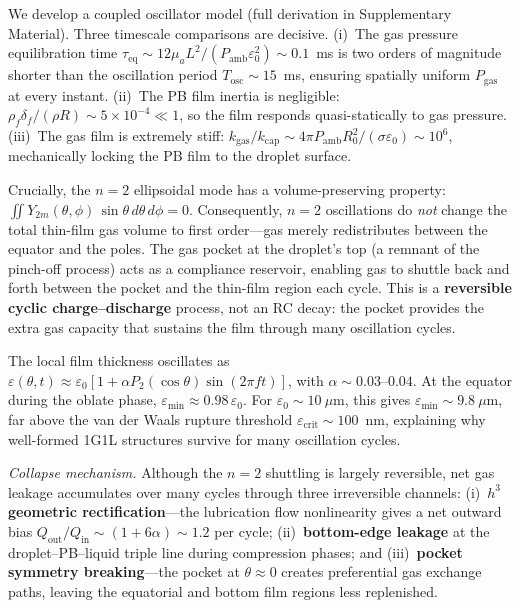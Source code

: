 \documentclass[%
 preprint,
 superscriptaddress,
 amsmath,amssymb,
 aps, prl,
]{revtex4-2}
\begin{document}
We develop a coupled oscillator model (full derivation in Supplementary Material). Three timescale comparisons are decisive. (i)~The gas pressure equilibration time $\tau_{\text{eq}} \sim 12\mu_a L^2/(P_{\text{amb}}\varepsilon_0^2) \sim 0.1$~ms is two orders of magnitude shorter than the oscillation period $T_{\text{osc}} \sim 15$~ms, ensuring spatially uniform $P_{\text{gas}}$ at every instant. (ii)~The PB film inertia is negligible: $\rho_f\delta_f/(\rho R) \sim 5\times10^{-4} \ll 1$, so the film responds quasi-statically to gas pressure. (iii)~The gas film is extremely stiff: $k_{\text{gas}}/k_{\text{cap}} \sim 4\pi P_{\text{amb}}R_0^2/(\sigma\varepsilon_0) \sim 10^6$, mechanically locking the PB film to the droplet surface.\par

Crucially, the $n=2$ ellipsoidal mode has a volume-preserving property: $\iint Y_{2m}(\theta,\phi)\,\sin\theta\,d\theta\,d\phi = 0$. Consequently, $n=2$ oscillations do \textit{not} change the total thin-film gas volume to first order---gas merely redistributes between the equator and the poles. The gas pocket at the droplet's top (a remnant of the pinch-off process) acts as a compliance reservoir, enabling gas to shuttle back and forth between the pocket and the thin-film region each cycle. This is a \textbf{reversible cyclic charge--discharge} process, not an RC decay: the pocket provides the extra gas capacity that sustains the film through many oscillation cycles.\par

The local film thickness oscillates as $\varepsilon(\theta,t) \approx \varepsilon_0[1 + \alpha P_2(\cos\theta)\sin(2\pi f t)]$, with $\alpha \sim 0.03$--$0.04$. At the equator during the oblate phase, $\varepsilon_{\min} \approx 0.98\,\varepsilon_0$. For $\varepsilon_0 \sim 10~\mu\text{m}$, this gives $\varepsilon_{\min} \sim 9.8~\mu\text{m}$, far above the van der Waals rupture threshold $\varepsilon_{\text{crit}} \sim 100$~nm, explaining why well-formed 1G1L structures survive for many oscillation cycles.\par

{\noindent\textit{Collapse mechanism.}}
Although the $n=2$ shuttling is largely reversible, net gas leakage accumulates over many cycles through three irreversible channels: (i)~\textbf{$h^3$ geometric rectification}---the lubrication flow nonlinearity gives a net outward bias $Q_{\text{out}}/Q_{\text{in}} \sim (1+6\alpha) \sim 1.2$ per cycle; (ii)~\textbf{bottom-edge leakage} at the droplet--PB--liquid triple line during compression phases; and (iii)~\textbf{pocket symmetry breaking}---the pocket at $\theta \approx 0$ creates preferential gas exchange paths, leaving the equatorial and bottom film regions less replenished.\par
\end{document}
